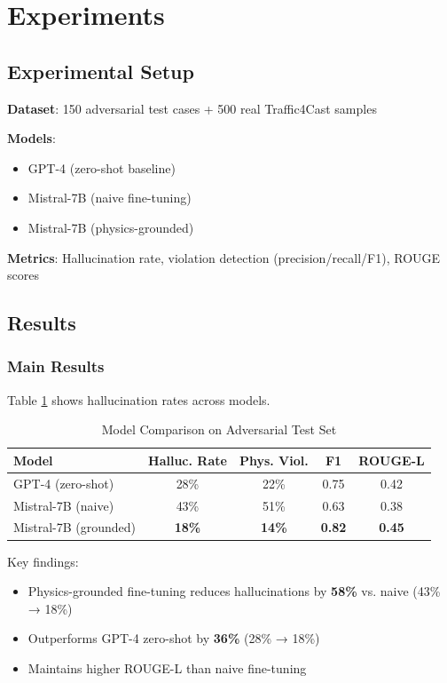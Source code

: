 \documentclass[conference]{IEEEtran}
\begin{document}
\section{Experiments}

\subsection{Experimental Setup}

\textbf{Dataset}: 150 adversarial test cases + 500 real Traffic4Cast samples \cite{kreil2020traffic4cast}

\textbf{Models}:
\begin{itemize}
    \item GPT-4 (zero-shot baseline)
    \item Mistral-7B (naive fine-tuning)
    \item Mistral-7B (physics-grounded)
\end{itemize}

\textbf{Metrics}: Hallucination rate, violation detection (precision/recall/F1), ROUGE scores

\subsection{Results}

\subsubsection{Main Results}

Table \ref{tab:comparison} shows hallucination rates across models.

\begin{table}[h]
\centering
\caption{Model Comparison on Adversarial Test Set}
\label{tab:comparison}
\begin{tabular}{lcccc}
\toprule
\textbf{Model} & \textbf{Halluc. Rate} & \textbf{Phys. Viol.} & \textbf{F1} & \textbf{ROUGE-L} \\
\midrule
GPT-4 (zero-shot) & 28\% & 22\% & 0.75 & 0.42 \\
Mistral-7B (naive) & 43\% & 51\% & 0.63 & 0.38 \\
Mistral-7B (grounded) & \textbf{18\%} & \textbf{14\%} & \textbf{0.82} & \textbf{0.45} \\
\bottomrule
\end{tabular}
\end{table}

Key findings:
\begin{itemize}
    \item Physics-grounded fine-tuning reduces hallucinations by \textbf{58\%} vs. naive (43\% → 18\%)
    \item Outperforms GPT-4 zero-shot by \textbf{36\%} (28\% → 18\%)
    \item Maintains higher ROUGE-L than naive fine-tuning
\end{itemize}
\end{document}
